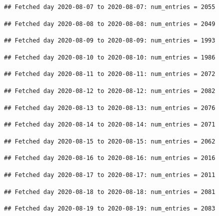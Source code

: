 \documentclass[]{article}
\begin{document}
\begin{verbatim}
## Fetched day 2020-08-07 to 2020-08-07: num_entries = 2055
\end{verbatim}

\begin{verbatim}
## Fetched day 2020-08-08 to 2020-08-08: num_entries = 2049
\end{verbatim}

\begin{verbatim}
## Fetched day 2020-08-09 to 2020-08-09: num_entries = 1993
\end{verbatim}

\begin{verbatim}
## Fetched day 2020-08-10 to 2020-08-10: num_entries = 1986
\end{verbatim}

\begin{verbatim}
## Fetched day 2020-08-11 to 2020-08-11: num_entries = 2072
\end{verbatim}

\begin{verbatim}
## Fetched day 2020-08-12 to 2020-08-12: num_entries = 2082
\end{verbatim}

\begin{verbatim}
## Fetched day 2020-08-13 to 2020-08-13: num_entries = 2076
\end{verbatim}

\begin{verbatim}
## Fetched day 2020-08-14 to 2020-08-14: num_entries = 2071
\end{verbatim}

\begin{verbatim}
## Fetched day 2020-08-15 to 2020-08-15: num_entries = 2062
\end{verbatim}

\begin{verbatim}
## Fetched day 2020-08-16 to 2020-08-16: num_entries = 2016
\end{verbatim}

\begin{verbatim}
## Fetched day 2020-08-17 to 2020-08-17: num_entries = 2011
\end{verbatim}

\begin{verbatim}
## Fetched day 2020-08-18 to 2020-08-18: num_entries = 2081
\end{verbatim}

\begin{verbatim}
## Fetched day 2020-08-19 to 2020-08-19: num_entries = 2083
\end{verbatim}
\end{document}
